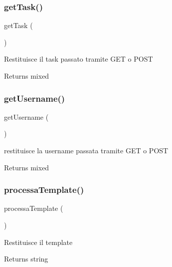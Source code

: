 \subsubsection{\texorpdfstring{get\+Task()}{getTask()}}
{\footnotesize\ttfamily get\+Task (\begin{DoxyParamCaption}{ }\end{DoxyParamCaption})}

Restituisce il task passato tramite G\+ET o P\+O\+ST

\begin{DoxyReturn}{Returns}
mixed 
\end{DoxyReturn}
\mbox{\label{class_v_registrazione_a81b37a3c9d639574e394f80c1138c75e}} 
\subsubsection{\texorpdfstring{get\+Username()}{getUsername()}}
{\footnotesize\ttfamily get\+Username (\begin{DoxyParamCaption}{ }\end{DoxyParamCaption})}

restituisce la username passata tramite G\+ET o P\+O\+ST

\begin{DoxyReturn}{Returns}
mixed 
\end{DoxyReturn}
\mbox{\label{class_v_registrazione_a64bdc484fc7074989b4b2c0ebc63aec2}} 
\subsubsection{\texorpdfstring{processa\+Template()}{processaTemplate()}}
{\footnotesize\ttfamily processa\+Template (\begin{DoxyParamCaption}{ }\end{DoxyParamCaption})}

Restituisce il template

\begin{DoxyReturn}{Returns}
string 
\end{DoxyReturn}
\mbox{\label{class_v_registrazione_a702b3376618a26e6c02c05bae65c6b9e}} 
